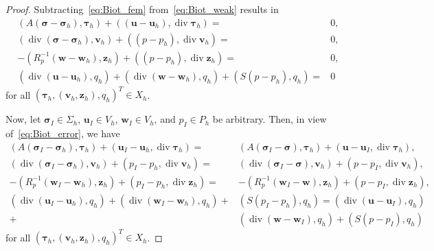 \documentclass[11pt]{amsart}
\theoremstyle{remark}
\theoremstyle{definition}
\def\sig{{\bm \sigma}}
\def\bu{{\boldsymbol u}}
\def\bv{{\boldsymbol v}}
\def\bw{{\boldsymbol w}}
\renewcommand{\div}{\operatorname{div}}
\renewcommand{\div}{\operatorname{div}}
\def\sig{\boldsymbol \sigma}
\def\bu{\boldsymbol u}
\def\bv{\boldsymbol v}
\def\bw{\boldsymbol w}
\def\bz{\boldsymbol z}
\begin{document}
\begin{proof}
Subtracting~\eqref{eq:Biot_fem} from~\eqref{eq:Biot_weak} results in
%
\begin{subequations}\label{eq:Biot_error}
\begin{align}   
(A (\sig-\sig_h), \bm \tau_h) + ((\bu-\bu_h),\div \bm \tau_h) = &  0, \label{eq:Biot_error1}\\
%
(\div (\sig-\sig_h),\bv_h) + ((p-p_h), \div \bv_h) = & 0,  \label{eq:Biot_error2}\\  
%
- (R_p^{-1}  (\bw-\bw_h), \bz_h) + ((p-p_h),\div \bz_h) = &  0, \label{eq:Biot_error3} \\ 
%
(\div (\bu-\bu_h), q_h) + (\div (\bw-\bw_h), q_h) + (S (p-p_h),q_h) = & 0  \label{eq:Biot_error4} 
\end{align}
\end{subequations}
for all $(\bm \tau_h,(\bv_h,\bz_h),q_h)^T \in X_h$.

Now, let $\sig_I \in \Sigma_h$, $\bu_I \in V_h$, $\bw_I \in V_h$, and $p_I \in P_h$ be arbitrary. Then, in view of~\eqref{eq:Biot_error}, we have
%
\begin{subequations}\label{eq:Biot_error_est}
\begin{align}   
(A (\sig_I-\sig_h), \bm \tau_h) + (\bu_I-\bu_h,\div \bm \tau_h) = &  (A (\sig_I-\sig), \bm \tau_h) + (\bu-\bu_I,\div \bm \tau_h), \label{eq:Biot_error_est1}\\
%
(\div (\sig_I-\sig_h),\bv_h) + (p_I-p_h, \div \bv_h) = & (\div (\sig_I-\sig),\bv_h) + (p-p_I, \div \bv_h),  \label{eq:Biot_error_est2}\\  
%
- (R_p^{-1}  (\bw_I-\bw_h), \bz_h) + (p_I-p_h,\div \bz_h) = &  - (R_p^{-1}  (\bw_I-\bw), \bz_h) + (p-p_I,\div \bz_h), \label{eq:Biot_error_est3} \\ 
%
(\div (\bu_I-\bu_h), q_h) + (\div (\bw_I-\bw_h), q_h) + & (S (p_I-p_h),q_h) 
=  (\div (\bu-\bu_I), q_h) \nonumber \\
+ & (\div (\bw -\bw_I), q_h) + (S (p-p_I),q_h)  \label{eq:Biot_error_est4} 
\end{align}
\end{subequations}
for all $(\bm \tau_h,(\bv_h,\bz_h),q_h)^T \in X_h$.


\end{proof}
\end{document}
